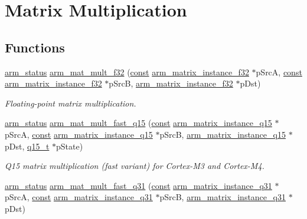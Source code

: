 \hypertarget{group___matrix_mult}{\section{Matrix Multiplication}
\label{group___matrix_mult}
}
\subsection*{Functions}
\begin{DoxyCompactItemize}
\item 
\hyperlink{arm__math_8h_a5e459c6409dfcd2927bb8a57491d7cf6}{arm\-\_\-status} \hyperlink{group___matrix_mult_ga917bf0270310c1d3f0eda1fc7c0026a0}{arm\-\_\-mat\-\_\-mult\-\_\-f32} (\hyperlink{group___n_a_m_e_ga7ae6d0e43244213b34de2c2b9aa30da6}{const} \hyperlink{structarm__matrix__instance__f32}{arm\-\_\-matrix\-\_\-instance\-\_\-f32} $\ast$p\-Src\-A, \hyperlink{group___n_a_m_e_ga7ae6d0e43244213b34de2c2b9aa30da6}{const} \hyperlink{structarm__matrix__instance__f32}{arm\-\_\-matrix\-\_\-instance\-\_\-f32} $\ast$p\-Src\-B, \hyperlink{structarm__matrix__instance__f32}{arm\-\_\-matrix\-\_\-instance\-\_\-f32} $\ast$p\-Dst)
\begin{DoxyCompactList}\small\item\em Floating-\/point matrix multiplication. \end{DoxyCompactList}\item 
\hyperlink{arm__math_8h_a5e459c6409dfcd2927bb8a57491d7cf6}{arm\-\_\-status} \hyperlink{group___matrix_mult_ga08f37d93a5bfef0c5000dc5e0a411f93}{arm\-\_\-mat\-\_\-mult\-\_\-fast\-\_\-q15} (\hyperlink{group___n_a_m_e_ga7ae6d0e43244213b34de2c2b9aa30da6}{const} \hyperlink{structarm__matrix__instance__q15}{arm\-\_\-matrix\-\_\-instance\-\_\-q15} $\ast$p\-Src\-A, \hyperlink{group___n_a_m_e_ga7ae6d0e43244213b34de2c2b9aa30da6}{const} \hyperlink{structarm__matrix__instance__q15}{arm\-\_\-matrix\-\_\-instance\-\_\-q15} $\ast$p\-Src\-B, \hyperlink{structarm__matrix__instance__q15}{arm\-\_\-matrix\-\_\-instance\-\_\-q15} $\ast$p\-Dst, \hyperlink{arm__math_8h_ab5a8fb21a5b3b983d5f54f31614052ea}{q15\-\_\-t} $\ast$p\-State)
\begin{DoxyCompactList}\small\item\em Q15 matrix multiplication (fast variant) for Cortex-\/\-M3 and Cortex-\/\-M4. \end{DoxyCompactList}\item 
\hyperlink{arm__math_8h_a5e459c6409dfcd2927bb8a57491d7cf6}{arm\-\_\-status} \hyperlink{group___matrix_mult_ga2785e8c1b785348b0c439b56aaf585a3}{arm\-\_\-mat\-\_\-mult\-\_\-fast\-\_\-q31} (\hyperlink{group___n_a_m_e_ga7ae6d0e43244213b34de2c2b9aa30da6}{const} \hyperlink{structarm__matrix__instance__q31}{arm\-\_\-matrix\-\_\-instance\-\_\-q31} $\ast$p\-Src\-A, \hyperlink{group___n_a_m_e_ga7ae6d0e43244213b34de2c2b9aa30da6}{const} \hyperlink{structarm__matrix__instance__q31}{arm\-\_\-matrix\-\_\-instance\-\_\-q31} $\ast$p\-Src\-B, \hyperlink{structarm__matrix__instance__q31}{arm\-\_\-matrix\-\_\-instance\-\_\-q31} $\ast$p\-Dst)

\end{DoxyCompactItemize}
